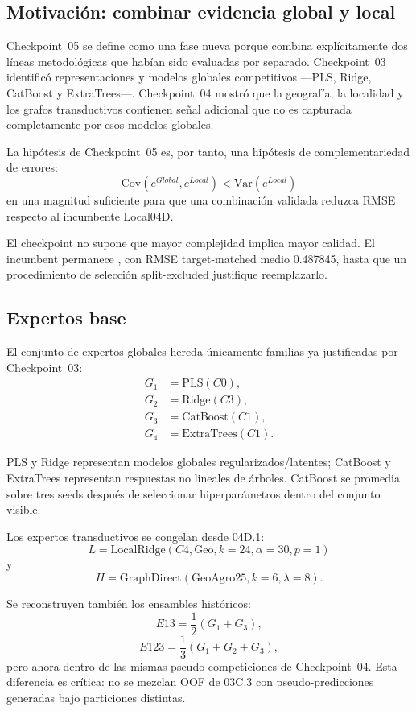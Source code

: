 \subsection{Motivación: combinar evidencia global y local}

Checkpoint~05 se define como una fase nueva porque combina explícitamente dos líneas
metodológicas que habían sido evaluadas por separado. Checkpoint~03 identificó representaciones
y modelos globales competitivos ---PLS, Ridge, CatBoost y ExtraTrees---. Checkpoint~04 mostró
que la geografía, la localidad y los grafos transductivos contienen señal adicional que no es
capturada completamente por esos modelos globales.

La hipótesis de Checkpoint~05 es, por tanto, una hipótesis de complementariedad de errores:
\[
\mathrm{Cov}(e^{Global},e^{Local})<\mathrm{Var}(e^{Local})
\]
en una magnitud suficiente para que una combinación validada reduzca RMSE respecto al
incumbente Local04D.

El checkpoint no supone que mayor complejidad implica mayor calidad. El incumbent permanece
, con RMSE target-matched medio
0.487845, hasta que un procedimiento de selección split-excluded justifique reemplazarlo.

\subsection{Expertos base}

El conjunto de expertos globales hereda únicamente familias ya justificadas por Checkpoint~03:
\begin{align*}
G_1 &= \mathrm{PLS}(C0),\\
G_2 &= \mathrm{Ridge}(C3),\\
G_3 &= \mathrm{CatBoost}(C1),\\
G_4 &= \mathrm{ExtraTrees}(C1).
\end{align*}

PLS y Ridge representan modelos globales regularizados/latentes; CatBoost y ExtraTrees
representan respuestas no lineales de árboles. CatBoost se promedia sobre tres seeds después
de seleccionar hiperparámetros dentro del conjunto visible.

Los expertos transductivos se congelan desde 04D.1:
\[
L=\mathrm{LocalRidge}(C4,\mathrm{Geo},k=24,\alpha=30,p=1)
\]
y
\[
H=\mathrm{GraphDirect}(\mathrm{GeoAgro25},k=6,\lambda=8).
\]

Se reconstruyen también los ensambles históricos:
\[
E13=\frac{1}{2}(G_1+G_3),
\]
\[
E123=\frac{1}{3}(G_1+G_2+G_3),
\]
pero ahora dentro de las mismas pseudo-competiciones de Checkpoint~04. Esta diferencia es
crítica: no se mezclan OOF de 03C.3 con pseudo-predicciones generadas bajo particiones
distintas.

